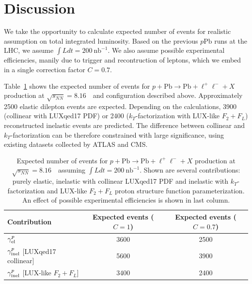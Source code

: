 \clearpage
\section{Discussion}
\label{sec:discussion}

We take the opportunity to calculate expected number of events for realistic assumption on total integrated luminosity.
Based on the previous $p\textrm{Pb}$ runs at the LHC, we assume  $\int Ldt= 200~\textrm{nb}^{-1}$.
We also assume possible experimental efficiencies, manily due to trigger and recontruction of leptons, which we embed in a single correction factor $C=0.7$.

Table~\ref{fig:numbers} shows the expected number of events for $p+\textrm{Pb}\rightarrow \textrm{Pb} + \ell^+\ell^- + X$ production at $\sqrt{s_{N N}} = 8.16$~\TeV\ and configuration described above. 
Approximately 2500 elastic dilepton events are expected. 
Depending on the calculations, 3900 (collinear with LUXqed17 PDF) or 2400 ($k_T$-factorization with LUX-like $F_2+F_L$) reconstructed inelastic events are predicted. The difference between collinear and $k_T$-factorization can be therefore constrained with large significance, using existing datasets collected by ATLAS and CMS.

\begin{table}[t]
\begin{center}
\begin{tabular}{|l|c|c|}
\hline
Contribution & Expected events ($C=1$) & Expected events ($C=0.7$) \\
\hline
$\gamma^{p}_{\rm{el}}$  & 3600 & 2500\\ %
\hline
$\gamma^{p}_{\rm{inel}}$ [LUXqed17 collinear] & 5600 & 3900 \\
\hline
$\gamma^{p}_{\rm{inel}}$ [LUX-like $F_2+F_L$] & 3400 & 2400 \\
\hline
\end{tabular}
\end{center}
\caption{Expected number of events for $p+\textrm{Pb}\rightarrow \textrm{Pb} + \ell^+\ell^- + X$ production at $\sqrt{s_{N N}} = 8.16$~\TeV\ assuming $\int Ldt= 200~\textrm{nb}^{-1}$. 
Shown are several contributions: purely elastic, inelastic with collinear LUXqed17 PDF and inelastic with $k_T$-factorization and LUX-like $F_2+F_L$ proton structure function parameterization.
An effect of possible experimental efficiencies is shown in last column.}
\label{fig:numbers}
\end{table}

